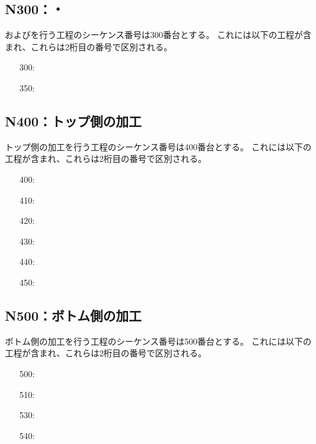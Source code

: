 \subsection{N300：\DimpleMilling ・\ReliefGrooveMilling}
\DimpleMilling および\ReliefGrooveMilling を行う工程のシーケンス番号は300番台とする。
これには以下の工程が含まれ、これらは2桁目の番号で区別される。
\begin{enumerate}
\item[300:] \DimpleMilling
\item[350:] \ReliefGrooveMilling
\end{enumerate}


\subsection{N400：トップ側の加工}
トップ側の加工を行う工程のシーケンス番号は400番台とする。
これには以下の工程が含まれ、これらは2桁目の番号で区別される。
\begin{enumerate}
\item[400:] \TopEndFacecutMilling
\item[410:] \TopOutcutMilling
\item[420:] \KeywayMilling
\item[430:] \TopEndFaceOutCChamferMilling
\item[440:] \TopEndFaceInCChamferMilling
\item[450:] \EndFaceBoringMilling
\end{enumerate}


\clearpage
\subsection{N500：ボトム側の加工}
ボトム側の加工を行う工程のシーケンス番号は500番台とする。
これには以下の工程が含まれ、これらは2桁目の番号で区別される。
\begin{enumerate}
\item[500:] \BottomEndFacecutMilling
\item[510:] \BottomOutcutMilling
\item[530:] \BottomEndFaceOutCChamferMilling
\item[540:] \BottomEndFaceInCChamferMilling
\end{enumerate}


